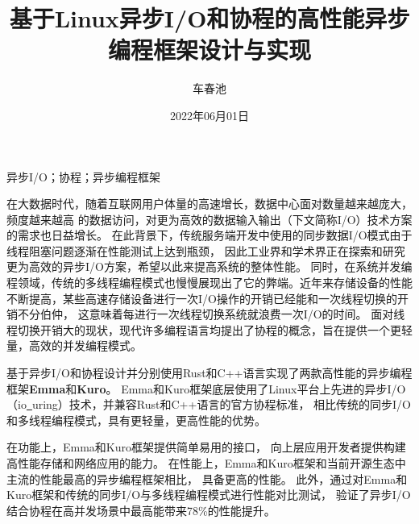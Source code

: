 \documentclass[supercite]{HustGraduPaper}
\title{基于Linux异步I/O和协程的高性能异步编程框架设计与实现}
\author{车春池}
\date{2022年06月01日}
\theoremstyle{definition}
\begin{document}
\maketitle

\statement

\clearpage


\begin{cnabstract}{异步I/O；协程；异步编程框架}

在大数据时代，随着互联网用户体量的高速增长，数据中心面对数量越来越庞大，频度越来越高
的数据访问，对更为高效的数据输入输出（下文简称I/O）技术方案的需求也日益增长。
在此背景下，传统服务端开发中使用的同步数据I/O模式由于线程阻塞问题逐渐在性能测试上达到瓶颈，
因此工业界和学术界正在探索和研究更为高效的异步I/O方案，希望以此来提高系统的整体性能。
同时，在系统并发编程领域，传统的多线程编程模式也慢慢展现出了它的弊端。近年来存储设备的性能
不断提高，某些高速存储设备进行一次I/O操作的开销已经能和一次线程切换的开销不分伯仲，
这意味着每进行一次线程切换系统就浪费一次I/O的时间。
面对线程切换开销大的现状，现代许多编程语言均提出了协程的概念，旨在提供一个更轻量，高效的并发编程模式。\par

基于异步I/O和协程设计并分别使用Rust和C++语言实现了两款高性能的异步编程框架\textbf{Emma}和\textbf{Kuro}。
Emma和Kuro框架底层使用了Linux平台上先进的异步I/O（io\underline{~}uring）技术，并兼容Rust和C++语言的官方协程标准，
相比传统的同步I/O和多线程编程模式，具有更轻量，更高性能的优势。\par

在功能上，Emma和Kuro框架提供简单易用的接口，
向上层应用开发者提供构建高性能存储和网络应用的能力。
在性能上，Emma和Kuro框架和当前开源生态中主流的性能最高的异步编程框架相比，
具备更高的性能。
此外，通过对Emma和Kuro框架和传统的同步I/O与多线程编程模式进行性能对比测试，
验证了异步I/O结合协程在高并发场景中最高能带来78\%的性能提升。\par

\end{cnabstract}
\end{document}
